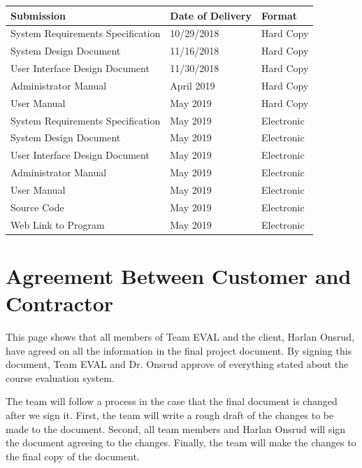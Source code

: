 \documentclass{article}
\begin{document}
\begin{center}
\begin{tabular}{|p{6cm}|p{3cm}|p{3cm}|} 
\hline
\textbf{Submission} & \textbf{Date of Delivery} & \textbf{Format} \\
\hline
System Requirements Specification & 10/29/2018 & Hard Copy\\ 
\hline
System Design Document & 11/16/2018 & Hard Copy\\ 
\hline
User Interface Design Document & 11/30/2018 & Hard Copy\\ 
\hline
Administrator Manual & April 2019 & Hard Copy\\ 
\hline
User Manual & May 2019 & Hard Copy\\ 
\hline
System Requirements Specification & May 2019 & Electronic\\ 
\hline
System Design Document & May 2019 & Electronic\\ 
\hline
User Interface Design Document & May 2019 & Electronic\\ 
\hline
Administrator Manual & May 2019 & Electronic\\ 
\hline
User Manual & May 2019 & Electronic\\ 
\hline
Source Code & May 2019 & Electronic\\ 
\hline
Web Link to Program & May 2019 & Electronic\\ 
\hline
\end{tabular}
\end{center}

\newpage
\section{Agreement Between Customer and Contractor}

This page shows that all members of Team EVAL and the client, Harlan Onsrud, have agreed on all the information in the final project document. By signing this document, Team EVAL and Dr. Onsrud approve of everything stated about the course evaluation system.

The team will follow a process in the case that the final document is changed after we sign it. First, the team will write a rough draft of the changes to be made to the document. Second, all team members and Harlan Onsrud will sign the document agreeing to the changes. Finally, the team will make the changes to the final copy of the document.
\end{document}
